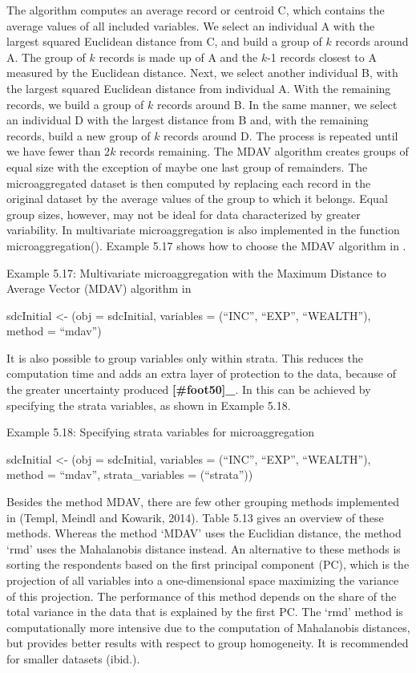 \documentclass[letterpaper,10pt,english]{sphinxmanual}
\begin{document}
The algorithm computes an average record or centroid C, which contains
the average values of all included variables. We select an individual A
with the largest squared Euclidean distance from C, and build a group of
\(k\) records around A. The group of \(k\) records is made up of
A and the \(k\)-1 records closest to A measured by the Euclidean
distance. Next, we select another individual B, with the largest squared
Euclidean distance from individual A. With the remaining records, we
build a group of \(k\) records around B. In the same manner, we
select an individual D with the largest distance from B and, with the
remaining records, build a new group of \(k\) records around D. The
process is repeated until we have fewer than 2\(k\) records
remaining. The MDAV algorithm creates groups of equal size with the
exception of maybe one last group of remainders. The microaggregated
dataset is then computed by replacing each record in the original
dataset by the average values of the group to which it belongs. Equal
group sizes, however, may not be ideal for data characterized by greater
variability. In  multivariate microaggregation is also
implemented in the function microaggregation(). Example 5.17 shows how
to choose the MDAV algorithm in .

Example 5.17: Multivariate microaggregation with the Maximum Distance to
Average Vector (MDAV) algorithm in 

sdcInitial \textless{}- (obj = sdcInitial, variables =
(“INC”, “EXP”, “WEALTH”), method = “mdav”)

It is also possible to group variables only within strata. This reduces
the computation time and adds an extra layer of protection to the data,
because of the greater uncertainty produced {\color{red}\bfseries{}{[}\#foot50{]}\_}. In
 this can be achieved by specifying the strata variables, as
shown in Example 5.18.

Example 5.18: Specifying strata variables for microaggregation

sdcInitial \textless{}- (obj = sdcInitial, variables =
(“INC”, “EXP”, “WEALTH”), method = “mdav”, strata\_variables =
(“strata”))

Besides the method MDAV, there are few other grouping methods
implemented in  (Templ, Meindl and Kowarik, 2014). Table 5.13
gives an overview of these methods. Whereas the method ‘MDAV’ uses the
Euclidian distance, the method ‘rmd’ uses the Mahalanobis distance
instead. An alternative to these methods is sorting the respondents
based on the first principal component (PC), which is the projection of
all variables into a one-dimensional space maximizing the variance of
this projection. The performance of this method depends on the share of
the total variance in the data that is explained by the first PC. The
‘rmd’ method is computationally more intensive due to the computation of
Mahalanobis distances, but provides better results with respect to group
homogeneity. It is recommended for smaller datasets (ibid.).
\end{document}
